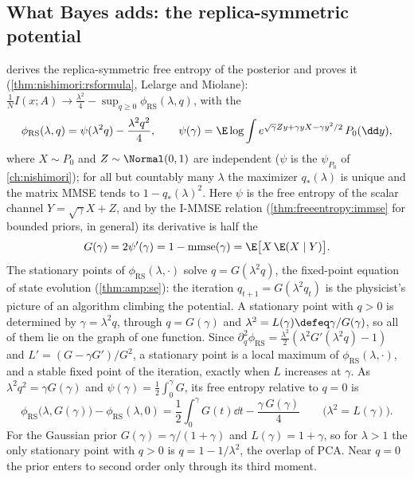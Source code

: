 \begin{refsection}
\subsection{What Bayes adds: the replica-symmetric potential}\label{sec:spiked:potential}

 derives the replica-symmetric free entropy of the posterior and proves it (\cref{thm:nishimori:rsformula}, Lelarge and Miolane): $\frac1NI(x;A)\to\frac{\lambda^2}4-\sup_{q\ge0}\phi_{\mathrm{RS}}(\lambda,q)$, with the 
\begin{equation}\label{eq:spiked:potential}
\phi_{\mathrm{RS}}(\lambda,q)=\psi(\lambda^2q)-\frac{\lambda^2q^2}4,\qquad\psi(\gamma)=\E\log\int e^{\sqrt\gamma Zy+\gamma yX-\gamma y^2/2}\,P_0(\dd y),
\end{equation}
where $X\sim P_0$ and $Z\sim\Normal(0,1)$ are independent ($\psi$ is the $\psi_{P_0}$ of \cref{ch:nishimori}); for all but countably many $\lambda$ the maximizer $q_*(\lambda)$ is unique and the matrix MMSE tends to $1-q_*(\lambda)^2$. Here $\psi$ is the free entropy of the scalar channel $Y=\sqrt\gamma X+Z$, and by the I-MMSE relation (\cref{thm:freeentropy:immse} for bounded priors, \textcite{GuoShamaiVerdu2005} in general) its derivative is half the 
\begin{equation}\label{eq:spiked:G}
G(\gamma)=2\psi'(\gamma)=1-\spikedmmse(\gamma)=\E\bigl[X\,\E(X\mid Y)\bigr].
\end{equation}
The stationary points of $\phi_{\mathrm{RS}}(\lambda,\cdot)$ solve $q=G(\lambda^2q)$, the fixed-point equation of state evolution (\cref{thm:amp:se}): the iteration $q_{t+1}=G(\lambda^2q_t)$ is the physicist's picture of an algorithm climbing the potential. A stationary point with $q>0$ is determined by $\gamma=\lambda^2q$, through $q=G(\gamma)$ and $\lambda^2=L(\gamma)\defeq\gamma/G(\gamma)$, so all of them lie on the graph of one function. Since $\partial_q^2\phi_{\mathrm{RS}}=\frac{\lambda^2}2(\lambda^2G'(\lambda^2q)-1)$ and $L'=(G-\gamma G')/G^2$, a stationary point is a local maximum of $\phi_{\mathrm{RS}}(\lambda,\cdot)$, and a stable fixed point of the iteration, exactly when $L$ increases at $\gamma$. As $\lambda^2q^2=\gamma G(\gamma)$ and $\psi(\gamma)=\frac12\int_0^\gamma G$, its free entropy relative to $q=0$ is
\begin{equation}\label{eq:spiked:dphi}
\phi_{\mathrm{RS}}\bigl(\lambda,G(\gamma)\bigr)-\phi_{\mathrm{RS}}(\lambda,0)=\frac12\int_0^\gamma G(t)\dd t-\frac{\gamma\,G(\gamma)}4\qquad\bigl(\lambda^2=L(\gamma)\bigr).
\end{equation}
For the Gaussian prior $G(\gamma)=\gamma/(1+\gamma)$ and $L(\gamma)=1+\gamma$, so for $\lambda>1$ the only stationary point with $q>0$ is $q=1-1/\lambda^2$, the overlap of PCA. Near $q=0$ the prior enters to second order only through its third moment.


\end{refsection}
